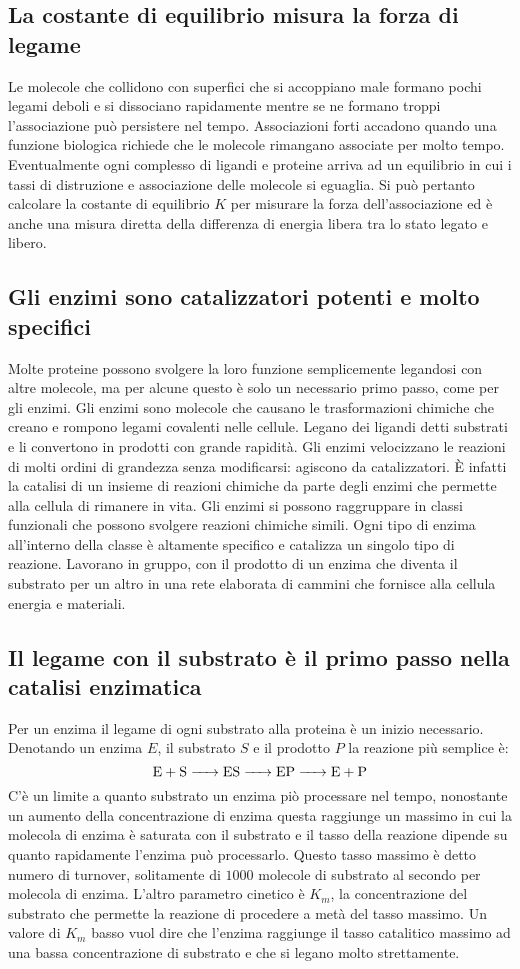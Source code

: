 \subsection{La costante di equilibrio misura la forza di legame}
Le molecole che collidono con superfici che si accoppiano male formano pochi legami deboli e si dissociano rapidamente mentre se ne formano troppi l'associazione pu\`o persistere
nel tempo. Associazioni forti accadono quando una funzione biologica richiede che le molecole rimangano associate per molto tempo. Eventualmente ogni complesso di ligandi e proteine
arriva ad un equilibrio in cui i tassi di distruzione e associazione delle molecole si eguaglia. Si pu\`o pertanto calcolare la costante di equilibrio $K$ per misurare la forza 
dell'associazione ed \`e anche una misura diretta della differenza di energia libera tra lo stato legato e libero. 
\subsection{Gli enzimi sono catalizzatori potenti e molto specifici}
Molte proteine possono svolgere la loro funzione semplicemente legandosi con altre molecole, ma per alcune questo \`e solo un necessario primo passo, come per gli enzimi. Gli enzimi sono
molecole che causano le trasformazioni chimiche che creano e rompono legami covalenti nelle cellule. Legano dei ligandi detti substrati e li convertono in prodotti con grande rapidit\`a.
Gli enzimi velocizzano le reazioni di molti ordini di grandezza senza modificarsi: agiscono da catalizzatori. \`E infatti la catalisi di un insieme di reazioni chimiche da parte degli
enzimi che permette alla cellula di rimanere in vita. Gli enzimi si possono raggruppare in classi funzionali che possono svolgere reazioni chimiche simili. Ogni tipo di enzima 
all'interno della classe \`e altamente specifico e catalizza un singolo tipo di reazione. Lavorano in gruppo, con il prodotto di un enzima che diventa il substrato per un altro in una
rete elaborata di cammini che fornisce alla cellula energia e materiali.
\subsection{Il legame con il substrato \`e il primo passo nella catalisi enzimatica}
Per un enzima il legame di ogni substrato alla proteina \`e un inizio necessario. Denotando un enzima $E$, il substrato $S$ e il prodotto $P$ la reazione pi\`u semplice \`e:
$$\ce{E + S -> ES -> EP -> E + P}$$
C'\`e un limite a quanto substrato un enzima pi\`o processare nel tempo, nonostante un aumento della concentrazione di enzima questa raggiunge un massimo in cui la molecola di enzima 
\`e saturata con il substrato e il tasso della reazione dipende su quanto rapidamente l'enzima pu\`o processarlo. Questo tasso massimo \`e detto numero di turnover, solitamente di 
$1000$ molecole di substrato al secondo per molecola di enzima. L'altro parametro cinetico \`e $K_m$, la concentrazione del substrato che permette la reazione di procedere a met\`a 
del tasso massimo. Un valore di $K_m$ basso vuol dire che l'enzima raggiunge il tasso catalitico massimo ad una bassa concentrazione di substrato e che si legano molto strettamente. 
